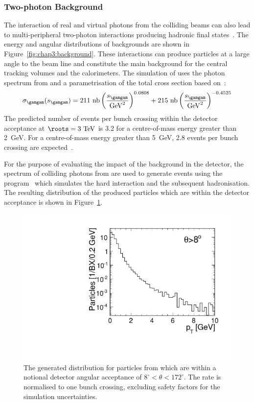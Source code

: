 \subsubsection{Two-photon Background\label{sec:chapter3:environment:gammagamma}}

The interaction of real and virtual photons from the colliding beams can also
lead to multi-peripheral two-photon interactions producing hadronic final
states~\cite{dreesgodbole1991,Chen:561345}. The energy and
angular distributions of \gghadrons backgrounds are shown in
Figure~\ref{fig:chap3:background}. These interactions can produce particles at
a large angle to the beam line and constitute the main background for the
central tracking volumes and the calorimeters. 
The simulation of \gghadrons uses the photon spectrum from \guineapig and
a parametrisation of the total cross section based on~\cite{Schuler:1996en}: 
\begin{equation}
\sigma_{\gamgam}(s_{\gamgam})= 211~\mathrm{nb}\left(\frac{s_{\gamgam}}{\mathrm{GeV}^2}\right)^{0.0808} +215~\mathrm{nb}\left(\frac{s_{\gamgam}}{\mathrm{GeV}^2}\right)^{-0.4525}
\end{equation}
The predicted number of \gghadrons events per bunch crossing within the
detector acceptance at $\roots=3~\mathrm{TeV}$ is 3.2 for a \gamgam centre-of-mass
energy greater than 2~GeV. For a \gamgam centre-of-mass energy greater than
5~GeV, 2.8 \gghadrons events per bunch crossing are expected~\cite{barklow_bg}.

For the purpose of evaluating the impact of the \gghadrons background in the
detector, the spectrum of colliding photons from \guineapig are used to
generate events using the \pythia program~\cite{Sjostrand2006} which
simulates the hard interaction and the subsequent hadronisation. The resulting
\pT distribution of the produced particles which are within the detector acceptance is shown
in Figure~\ref{fig:chap3:gghad-pt}.

\begin{figure}[hbt]
\centering
\includegraphics[width=0.49\linewidth]{../Chap3_ExpCond_PhysPerfsReqs/gghad-pt.pdf}
 \caption{The generated \pT distribution for particles from \gghadrons which are within a notional 
 detector angular acceptance of $8^\circ<\theta<172^\circ$. The rate
 is normalised to one bunch crossing, excluding safety factors for the simulation uncertainties.
 \label{fig:chap3:gghad-pt}}
\end{figure}



